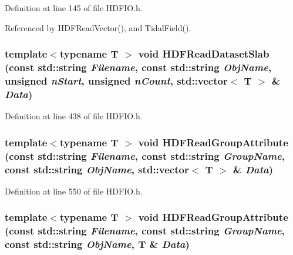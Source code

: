 Definition at line 145 of file HDFIO.h.



Referenced by HDFReadVector(), and TidalField().

\subsubsection[{HDFReadDatasetSlab}]{\setlength{\rightskip}{0pt plus 5cm}template$<$typename T $>$ void HDFReadDatasetSlab (const std::string {\em Filename}, \/  const std::string {\em ObjName}, \/  unsigned {\em nStart}, \/  unsigned {\em nCount}, \/  std::vector$<$ T $>$ \& {\em Data})}\label{HDFIO_8h_ac10c67494671661d5466ff2258154c8a}


Definition at line 438 of file HDFIO.h.

\subsubsection[{HDFReadGroupAttribute}]{\setlength{\rightskip}{0pt plus 5cm}template$<$typename T $>$ void HDFReadGroupAttribute (const std::string {\em Filename}, \/  const std::string {\em GroupName}, \/  const std::string {\em ObjName}, \/  std::vector$<$ T $>$ \& {\em Data})}\label{HDFIO_8h_aa73c5851b1f8ae24364803f9578b1d8f}


Definition at line 550 of file HDFIO.h.

\subsubsection[{HDFReadGroupAttribute}]{\setlength{\rightskip}{0pt plus 5cm}template$<$typename T $>$ void HDFReadGroupAttribute (const std::string {\em Filename}, \/  const std::string {\em GroupName}, \/  const std::string {\em ObjName}, \/  T \& {\em Data})}\label{HDFIO_8h_ab2ce05626da8d9a7d059795c4d5f02cc}


